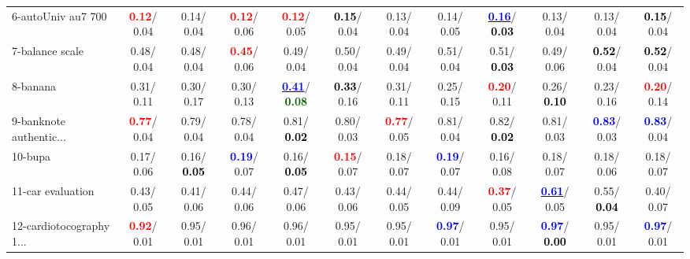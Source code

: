 \begin{table}[h]
\begin{center}
{\begin{tabular}{lc|c|c|c|c|c|c|c|c|c|c}
6-autoUniv au7 700 & \textcolor{red}{\textbf{  0.12}}/  0.04 &   0.14/  0.04 & \textcolor{red}{\textbf{  0.12}}/  0.06 & \textcolor{red}{\textbf{  0.12}}/  0.05 & \textcolor{black}{\textbf{  0.15}}/  0.04 &   0.13/  0.04 &   0.14/  0.05 & \underline{\textcolor{blue}{\textbf{  0.16}}}/\textcolor{black}{\textbf{  0.03}} &   0.13/  0.04 &   0.13/  0.04 & \textcolor{black}{\textbf{  0.15}}/  0.04 \\
7-balance scale &   0.48/  0.04 &   0.48/  0.04 & \textcolor{red}{\textbf{  0.45}}/  0.06 &   0.49/  0.04 &   0.50/  0.04 &   0.49/  0.04 &   0.51/  0.04 &   0.51/\textcolor{black}{\textbf{  0.03}} &   0.49/  0.06 & \textcolor{black}{\textbf{  0.52}}/  0.04 & \textcolor{black}{\textbf{  0.52}}/  0.04 \\ \hline
8-banana &   0.31/  0.11 &   0.30/  0.17 &   0.30/  0.13 & \underline{\textcolor{blue}{\textbf{  0.41}}}/\textcolor{darkgreen}{\textbf{  0.08}} & \textcolor{black}{\textbf{  0.33}}/  0.16 &   0.31/  0.11 &   0.25/  0.15 & \textcolor{red}{\textbf{  0.20}}/  0.11 &   0.26/\textcolor{black}{\textbf{  0.10}} &   0.23/  0.16 & \textcolor{red}{\textbf{  0.20}}/  0.14 \\
9-banknote authentic... & \textcolor{red}{\textbf{  0.77}}/  0.04 &   0.79/  0.04 &   0.78/  0.04 &   0.81/\textcolor{black}{\textbf{  0.02}} &   0.80/  0.03 & \textcolor{red}{\textbf{  0.77}}/  0.05 &   0.81/  0.04 &   0.82/\textcolor{black}{\textbf{  0.02}} &   0.81/  0.03 & \textcolor{blue}{\textbf{  0.83}}/  0.03 & \textcolor{blue}{\textbf{  0.83}}/  0.04 \\
10-bupa &   0.17/  0.06 &   0.16/\textcolor{black}{\textbf{  0.05}} & \textcolor{blue}{\textbf{  0.19}}/  0.07 &   0.16/\textcolor{black}{\textbf{  0.05}} & \textcolor{red}{\textbf{  0.15}}/  0.07 &   0.18/  0.07 & \textcolor{blue}{\textbf{  0.19}}/  0.07 &   0.16/  0.08 &   0.18/  0.07 &   0.18/  0.06 &   0.18/  0.07 \\
11-car evaluation &   0.43/  0.05 &   0.41/  0.06 &   0.44/  0.06 &   0.47/  0.06 &   0.43/  0.06 &   0.44/  0.05 &   0.44/  0.09 & \textcolor{red}{\textbf{  0.37}}/  0.05 & \underline{\textcolor{blue}{\textbf{  0.61}}}/  0.05 &   0.55/\textcolor{black}{\textbf{  0.04}} &   0.40/  0.07 \\
12-cardiotocography 1... & \textcolor{red}{\textbf{  0.92}}/  0.01 &   0.95/  0.01 &   0.96/  0.01 &   0.96/  0.01 &   0.95/  0.01 &   0.95/  0.01 & \textcolor{blue}{\textbf{  0.97}}/  0.01 &   0.95/  0.01 & \textcolor{blue}{\textbf{  0.97}}/\textcolor{black}{\textbf{  0.00}} &   0.95/  0.01 & \textcolor{blue}{\textbf{  0.97}}/  0.01 \\

\end{tabular}}
\end{center}
\end{table}
